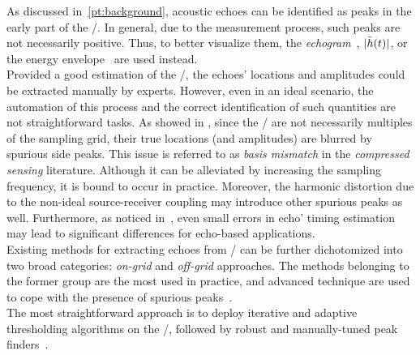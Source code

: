 As discussed in~\cref{pt:background}, acoustic echoes can be identified as peaks in the early part of the \RIR/.
In general, due to the measurement process, such peaks are not necessarily positive.
Thus, to better visualize them, the \textit{echogram}~, $|{\tilde{h}(t)}|$, or the energy envelope~ are used instead.
\\Provided a good estimation of the \RIRs/, the echoes' locations and amplitudes could be extracted manually by experts.
However, even in an ideal scenario, the automation of this process and the correct identification of such quantities are not straightforward tasks.
As showed in , since the \TOAs/ are not necessarily multiples of the sampling grid, their true locations (and amplitudes) are blurred by spurious side peaks.
This issue is referred to as \textit{basis mismatch} in the \textit{compressed sensing} literature.
Although it can be alleviated by increasing the sampling frequency, it is bound to occur in practice.
Moreover, the harmonic distortion due to the non-ideal source-receiver coupling may introduce other spurious peaks as well.
Furthermore, as noticed in~, even small errors in echo' timing estimation may lead to significant differences for echo-based applications.
\\Existing methods for extracting echoes from \RIRs/ can be further dichotomized into two broad categories: \textit{on-grid} and \textit{off-grid} approaches.
The methods belonging to the former group are the most used in practice, and advanced technique are used to cope with the presence of spurious peaks~.
\\The most straightforward approach is to deploy iterative and adaptive thresholding algorithms on the \RIR/, followed by robust and manually-tuned peak finders~.
